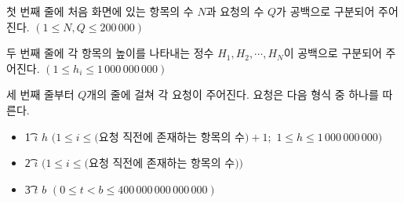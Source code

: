 첫 번째 줄에 처음 화면에 있는 항목의 수 $N$과 요청의 수 $Q$가 공백으로 구분되어 주어진다. $(1 \le N, Q \le 200\,000)$

두 번째 줄에 각 항목의 높이를 나타내는 정수 $H_1, H_2, \cdots, H_N$이 공백으로 구분되어 주어진다. $(1 \le h_i \le 1\,000\,000\,000)$

세 번째 줄부터 $Q$개의 줄에 걸쳐 각 요청이 주어진다. 요청은 다음 형식 중 하나를 따른다.

\begin{itemize}
\item \t{1} $i$ $h$ $(1 \le i \le ($요청 직전에 존재하는 항목의 수$)+1;$ $1 \le h \le 1\,000\,000\,000)$
\item \t{2} $i$ $(1 \le i \le ($요청 직전에 존재하는 항목의 수$))$
\item \t{3} $t$ $b$ $(0 \le t \lt b \le 400\,000\,000\,000\,000)$
\end{itemize}
